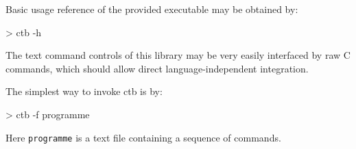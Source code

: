 Basic usage reference of the provided executable may be obtained by:
\begin{code}
> ctb -h
\end{code}


The text command controls of this library may be very easily interfaced by raw C commands, which should allow direct language-independent integration.

The simplest way to invoke ctb is by:
\begin{code}
> ctb -f programme
\end{code}

Here \texttt{programme} is a text file containing a sequence of commands.





